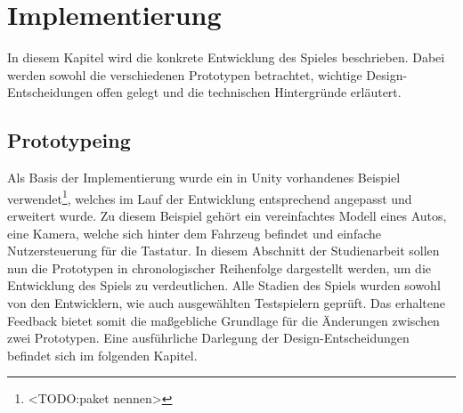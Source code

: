 \section{Implementierung}\label{sec:impl}
In diesem Kapitel wird die konkrete Entwicklung des Spieles beschrieben. Dabei werden sowohl die verschiedenen Prototypen betrachtet, wichtige Design-Entscheidungen offen gelegt und die technischen Hintergründe erläutert.
\subsection{Prototypeing}
	Als Basis der Implementierung wurde ein in Unity vorhandenes Beispiel verwendet\footnote{<TODO:paket nennen>}, welches im Lauf der Entwicklung entsprechend angepasst und erweitert wurde. Zu diesem Beispiel gehört ein vereinfachtes Modell eines Autos, eine Kamera, welche sich hinter dem Fahrzeug befindet und einfache Nutzersteuerung für die Tastatur.
	In diesem Abschnitt der Studienarbeit sollen nun die Prototypen in chronologischer Reihenfolge dargestellt werden, um die Entwicklung des Spiels zu verdeutlichen. Alle Stadien des Spiels wurden sowohl von den Entwicklern, wie auch ausgewählten Testspielern geprüft. Das erhaltene Feedback bietet somit die maßgebliche Grundlage für die Änderungen zwischen zwei Prototypen. Eine ausführliche Darlegung der Design-Entscheidungen befindet sich im folgenden Kapitel.
